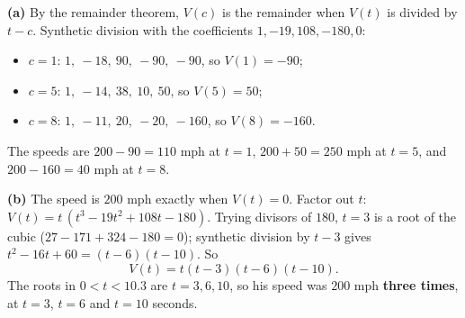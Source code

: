 \textbf{(a)} By the remainder theorem, $V(c)$ is the remainder when $V(t)$ is divided by $t-c$. Synthetic division with the coefficients $1,-19,108,-180,0$:
\begin{itemize}
\item $c=1$: $1,\ -18,\ 90,\ -90,\ -90$, so $V(1)=-90$;
\item $c=5$: $1,\ -14,\ 38,\ 10,\ 50$, so $V(5)=50$;
\item $c=8$: $1,\ -11,\ 20,\ -20,\ -160$, so $V(8)=-160$.
\end{itemize}
The speeds are $200-90=\boxed{110}$ mph at $t=1$, $200+50=\boxed{250}$ mph at $t=5$, and $200-160=\boxed{40}$ mph at $t=8$.

\textbf{(b)} The speed is $200$ mph exactly when $V(t)=0$. Factor out $t$: $V(t)=t\,(t^3-19t^2+108t-180)$. Trying divisors of $180$, $t=3$ is a root of the cubic ($27-171+324-180=0$); synthetic division by $t-3$ gives $t^2-16t+60=(t-6)(t-10)$. So
\[V(t)=t(t-3)(t-6)(t-10).\]
The roots in $0<t<10.3$ are $t=3,6,10$, so his speed was $200$ mph \textbf{three times}, at $t=3$, $t=6$ and $t=10$ seconds.
